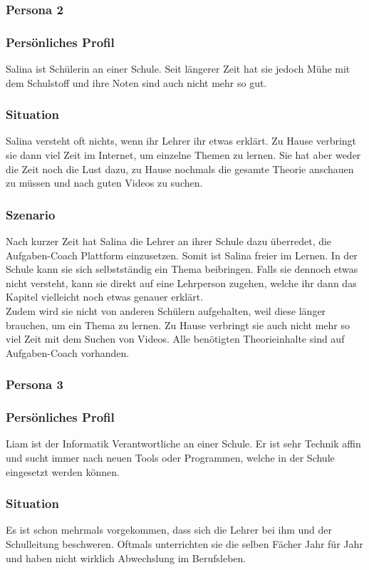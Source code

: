\subsubsection{Persona 2}
\subsubsection*{Persönliches Profil}
Salina ist Schülerin an einer Schule. Seit längerer Zeit hat sie jedoch Mühe mit dem Schulstoff und ihre Noten sind auch nicht mehr so gut.

\subsubsection*{Situation}
Salina versteht oft nichts, wenn ihr Lehrer ihr etwas erklärt. Zu Hause verbringt sie dann viel Zeit im Internet, um einzelne Themen zu lernen. Sie hat aber weder die Zeit noch die Lust dazu, zu Hause nochmals die gesamte Theorie anschauen zu müssen und nach guten Videos zu suchen.

\subsubsection*{Szenario}
Nach kurzer Zeit hat Salina die Lehrer an ihrer Schule dazu überredet, die Aufgaben-Coach Plattform einzusetzen. Somit ist Salina freier im Lernen. In der Schule kann sie sich selbstständig ein Thema beibringen. Falls sie dennoch etwas nicht versteht, kann sie direkt auf eine Lehrperson zugehen, welche ihr dann das Kapitel vielleicht noch etwas genauer erklärt. \\
Zudem wird sie nicht von anderen Schülern aufgehalten, weil diese länger brauchen, um ein Thema zu lernen. Zu Hause verbringt sie auch nicht mehr so viel Zeit mit dem Suchen von Videos. Alle benötigten Theorieinhalte sind auf Aufgaben-Coach vorhanden.

\subsubsection{Persona 3}
\subsubsection*{Persönliches Profil}
Liam ist der Informatik Verantwortliche an einer Schule. Er ist sehr Technik affin und sucht immer nach neuen Tools oder Programmen, welche in der Schule eingesetzt werden können.

\subsubsection*{Situation}
Es ist schon mehrmals vorgekommen, dass sich die Lehrer bei ihm und der Schulleitung beschweren. Oftmals unterrichten sie die selben Fächer Jahr für Jahr und haben nicht wirklich Abwechslung im Berufsleben. 

